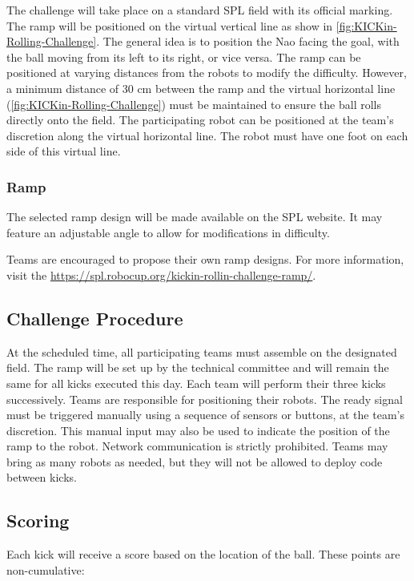 The challenge will take place on a standard SPL field with its official marking. 
The ramp will be positioned on the virtual vertical line as show in \cref{fig:KICKin-Rolling-Challenge}.
The general idea is to position the Nao facing the goal, with the ball moving from its left to its right, or vice versa.
The ramp can be positioned at varying distances from the robots to modify the difficulty.
However, a minimum distance of 30 cm between the ramp and the virtual horizontal line (\cref{fig:KICKin-Rolling-Challenge}) must be maintained to ensure the ball rolls directly onto the field.
The participating robot can be positioned at the team’s discretion along the virtual horizontal line.
The robot must have one foot on each side of this virtual line.

\subsubsection{Ramp}

The selected ramp design will be made available on the SPL website. 
It may feature an adjustable angle to allow for modifications in difficulty.  

Teams are encouraged to propose their own ramp designs. 
For more information, visit the \url{https://spl.robocup.org/kickin-rollin-challenge-ramp/}.

\subsection{Challenge Procedure}

At the scheduled time, all participating teams must assemble on the designated field.
The ramp will be set up by the technical committee and will remain the same for all kicks executed this day.
Each team will perform their three kicks successively.
Teams are responsible for positioning their robots.
The ready signal must be triggered manually using a sequence of sensors or buttons, at the team’s discretion.
This manual input may also be used to indicate the position of the ramp to the robot. 
Network communication is strictly prohibited. 
Teams may bring as many robots as needed, but they will not be allowed to deploy code between kicks.

\subsection{Scoring}

Each kick will receive a score based on the location of the ball.
These points are non-cumulative: 

